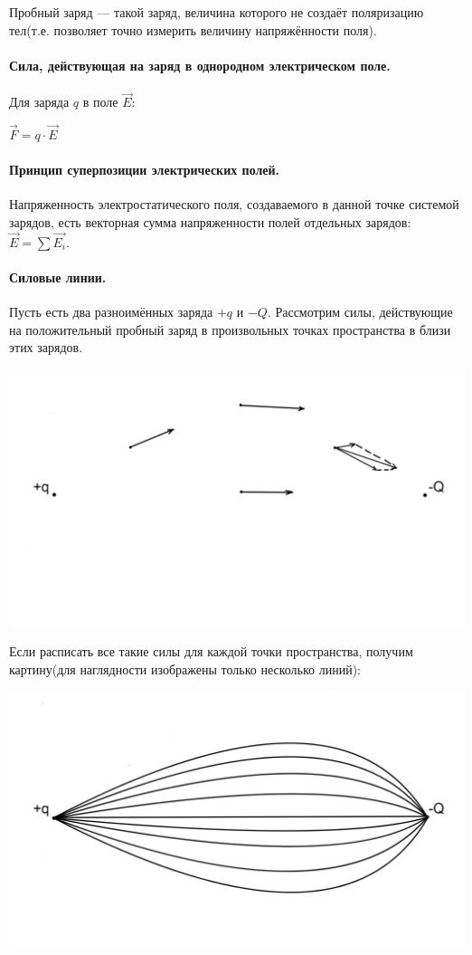 \documentclass{article}
\begin{document}
                Пробный заряд --- такой заряд, величина которого не создаёт поляризацию тел(т.е. позволяет точно измерить величину напряжённости поля).
            \paragraph{Сила, действующая на заряд в однородном электрическом поле.}
                Для заряда \(q\) в поле \(\vec E\):

                \(\vec F = q \cdot \vec E\)
            \paragraph{Принцип суперпозиции электрических полей.}
                Напряженность электростатического поля, создаваемого в данной точке системой зарядов, есть векторная сумма напряженности полей отдельных зарядов: \(\vec E = \sum{\vec{E_i}}\).
            \paragraph{Силовые линии.}
                Пусть есть два разноимённых заряда \(+q\) и \(-Q\). Рассмотрим силы, действующие на положительный пробный заряд в произвольных точках пространства в близи этих зарядов.
                
                \includegraphics[scale=0.15]{1_1_6_5-1.png}

                Если расписать все такие силы для каждой точки пространства, получим картину(для наглядности изображены только несколько линий):
                
                \includegraphics[scale=0.15]{1_1_6_5-2.png}
\end{document}
